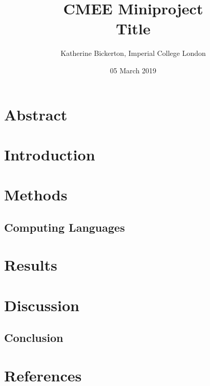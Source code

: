 \documentclass[11pt,a4paper,titlepage]{article}
\title{CMEE Miniproject \\ Title}
\date{05 March 2019}
\author{Katherine Bickerton, Imperial College London}
\begin{document}
	
	\maketitle
	
	\newpage
	\linenumbers
	
	\section{Abstract}
	
	\section{Introduction}
	
	\section{Methods}
	
	\subsection{Computing Languages}
	
	\section{Results}
	
	\section{Discussion}
	
	\subsection{Conclusion}	
	
	\section{References}
	
	
\end{document}
